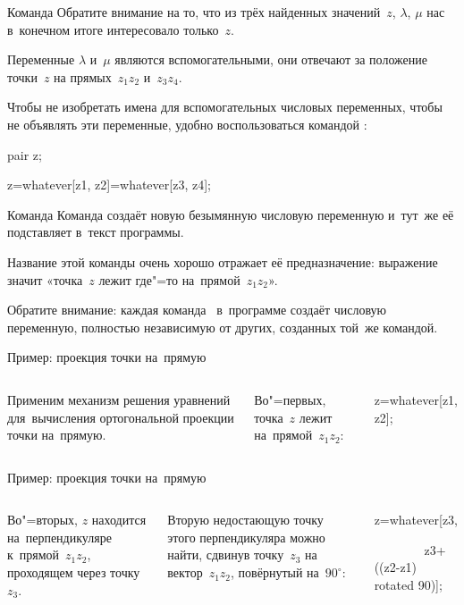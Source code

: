 \begin{frame}{Команда }
Обратите внимание на то, что из трёх найденных значений~$z$, $\lambda$, $\mu$
нас в~конечном итоге интересовало только~$z$.

Переменные $\lambda$ и~$\mu$ являются вспомогательными, они отвечают за
положение точки~$z$ на прямых~$z_1z_2$ и~$z_3z_4$.

Чтобы не изобретать имена для вспомогательных числовых переменных, чтобы не
объявлять эти переменные, удобно воспользоваться командой :
\begin{programlisting}
pair z;\par
z=whatever[z1, z2]=whatever[z3, z4];
\end{programlisting}
\end{frame}

\begin{frame}{Команда }
Команда  создаёт новую безымянную числовую переменную
и~тут~же её подставляет в~текст программы.

Название этой команды очень хорошо отражает её предназначение: выражение
 значит «точка~$z$ лежит где"=то
на~прямой~$z_1z_2$».

Обратите внимание: каждая команда~ в~программе создаёт
числовую переменную, полностью независимую от других, созданных той~же
командой.
\end{frame}

\begin{frame}{Пример: проекция точки на~прямую}
\begin{columns}
\centering
{}%
%
Применим механизм решения уравнений для~вычисления ортогональной проекции точки
на~прямую.

\pause
\bigskip
Во"=первых, точка~$z$ лежит на~прямой~$z_1z_2$:
\begin{programlisting}
z=whatever[z1, z2];
\end{programlisting}
\end{columns}
\end{frame}

\begin{frame}{Пример: проекция точки на~прямую}
\begin{columns}
\centering

Во"=вторых, $z$ находится на~перпендикуляре к~прямой~$z_1z_2$, проходящем через
точку~$z_3$.

\bigskip

Вторую недостающую точку этого перпендикуляра можно найти, сдвинув точку~$z_3$
на вектор~$z_1z_2$, повёрнутый на~$90^\circ$:
\begin{programlisting}
z=whatever[z3,\par
~~~~~~~~z3+((z2-z1) rotated 90)];
\end{programlisting}
\end{columns}
\end{frame}

